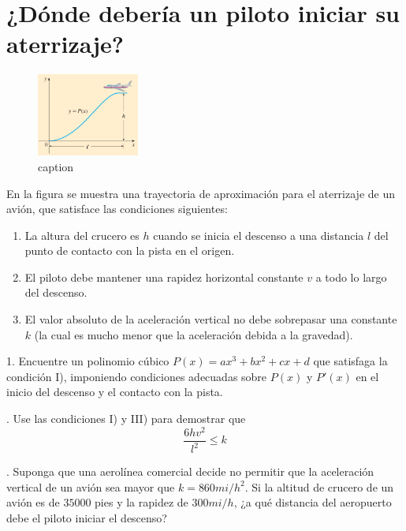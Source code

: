 \chapter*{¿Dónde debería un piloto iniciar su aterrizaje?}

\begin{figure}
	\centering
	\includegraphics[width = 0.3\textwidth]{recursos/Captura desde 2024-09-21 16-53-03.png}
	\caption{caption}
	\vspace{-60px}
\end{figure}
En la figura se muestra una trayectoria de aproximación para el aterrizaje de un avión, que satisface las condiciones siguientes:

\begin{enumerate}[label=\Roman*)]
	\item La altura del crucero es $h$ cuando se inicia el descenso a una distancia $l$ del punto de contacto con la pista en el origen.
	\item El piloto debe mantener una rapidez horizontal constante $v$ a todo lo largo del descenso.
	\item El valor absoluto de la aceleración vertical no debe sobrepasar una constante $k$ (la cual es mucho menor que la aceleración debida a la gravedad).
\end{enumerate}

1. Encuentre un polinomio cúbico $P(x)= ax^3+ bx^2 + cx + d$ que satisfaga la condición I), imponiendo condiciones adecuadas sobre $P(x)$ y $P'(x)$ en el inicio del descenso y el contacto con la pista.

\vspace{10pt}

. Use las condiciones I) y III) para demostrar que$$\frac{6hv^2}{l^2}\leq k$$

\vspace{10pt}

. Suponga que una aerolínea comercial decide no permitir que la aceleración vertical de un avión sea mayor que $k = 860 mi/h^2$. Si la altitud de crucero de un avión es de $35 000$ pies y la rapidez de $300 mi/h$, ¿a qué distancia del aeropuerto debe el piloto iniciar el descenso?

